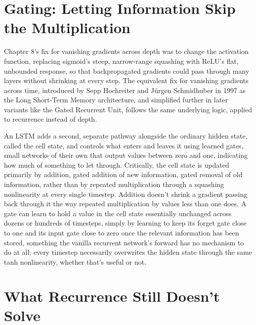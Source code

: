 \section*{Gating: Letting Information Skip the Multiplication}

Chapter 8's fix for vanishing gradients across depth was to change the activation function, replacing sigmoid's steep, narrow-range squashing with ReLU's flat, unbounded response, so that backpropagated gradients could pass through many layers without shrinking at every step. The equivalent fix for vanishing gradients across time, introduced by Sepp Hochreiter and Jürgen Schmidhuber in 1997 as the Long Short-Term Memory architecture, and simplified further in later variants like the Gated Recurrent Unit, follows the same underlying logic, applied to recurrence instead of depth.

An LSTM adds a second, separate pathway alongside the ordinary hidden state, called the cell state, and controls what enters and leaves it using learned gates, small networks of their own that output values between zero and one, indicating how much of something to let through. Critically, the cell state is updated primarily by addition, gated addition of new information, gated removal of old information, rather than by repeated multiplication through a squashing nonlinearity at every single timestep. Addition doesn't shrink a gradient passing back through it the way repeated multiplication by values less than one does. A gate can learn to hold a value in the cell state essentially unchanged across dozens or hundreds of timesteps, simply by learning to keep its forget gate close to one and its input gate close to zero once the relevant information has been stored, something the vanilla recurrent network's forward has no mechanism to do at all; every timestep necessarily overwrites the hidden state through the same tanh nonlinearity, whether that's useful or not.

\section*{What Recurrence Still Doesn't Solve}

